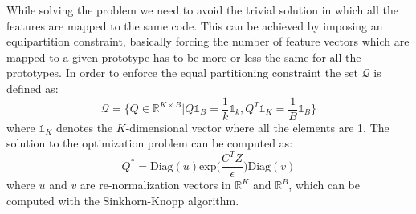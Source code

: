 While solving the problem we need to avoid the trivial solution in which all the features are mapped to the same code. This can be achieved by imposing an equipartition constraint, basically forcing the number of feature vectors which are mapped to a given prototype has to be more or less the same for all the prototypes. In order to enforce the equal partitioning constraint the set $\mathcal{Q}$ is defined as:
\[ \mathcal{Q} = \{Q \in \mathbb{R}^{K \times B} | Q\mathds{1}_B = \frac{1}{k}\mathds{1}_k, Q^T\mathds{1}_K = \frac{1}{B}\mathds{1}_B \} \]
where $\mathds{1}_K$ denotes the $K$-dimensional vector where all the elements are 1. The solution to the optimization problem can be computed as:
\[ Q^* = \text{Diag}(u)\text{exp}\Big(\frac{C^TZ}{\epsilon}\Big)\text{Diag}(v) \]
where $u$ and $v$ are re-normalization vectors in $\mathbb{R}^K$ and $\mathbb{R}^B$, which can be computed with the Sinkhorn-Knopp algorithm.
